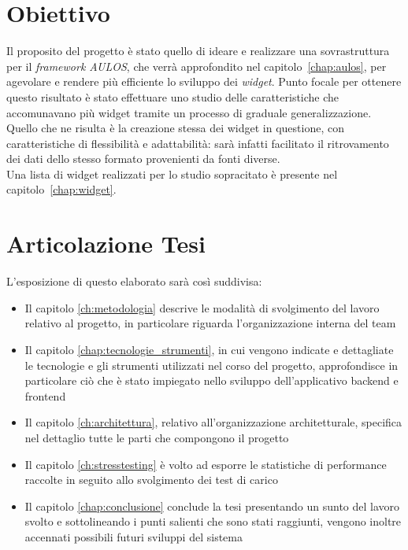 \pagebreak
\section{Obiettivo}
Il proposito del progetto è stato quello di ideare e realizzare una sovrastruttura per il \textit{framework AULOS}, che verrà approfondito nel capitolo~\ref{chap:aulos}, per agevolare e rendere più efficiente lo sviluppo dei \textit{widget}. Punto focale per ottenere questo risultato è stato effettuare uno studio delle caratteristiche che accomunavano più widget tramite un processo di graduale generalizzazione.
Quello che ne risulta è la creazione stessa dei widget in questione, con caratteristiche di flessibilità e adattabilità: sarà infatti facilitato il ritrovamento dei dati dello stesso formato provenienti da fonti diverse. \\
Una lista di widget realizzati per lo studio sopracitato è presente nel capitolo~\ref{chap:widget}.

\section{Articolazione Tesi}
L'esposizione di questo elaborato sarà così suddivisa:
\begin{itemize}
    \item Il capitolo \ref{ch:metodologia} descrive le modalità di svolgimento del lavoro relativo al progetto, in particolare riguarda l'organizzazione interna del team
    \item Il capitolo \ref{chap:tecnologie_strumenti}, in cui vengono indicate e dettagliate le tecnologie e gli strumenti utilizzati nel corso del progetto, approfondisce in particolare ciò che è stato impiegato nello sviluppo dell'applicativo backend e frontend
    \item Il capitolo \ref{ch:architettura}, relativo all'organizzazione architetturale, specifica nel dettaglio tutte le parti che compongono il progetto
    \item Il capitolo \ref{ch:stresstesting} è volto ad esporre le statistiche di performance raccolte in seguito allo svolgimento dei test di carico
    \item Il capitolo \ref{chap:conclusione} conclude la tesi presentando un sunto del lavoro svolto e sottolineando i punti salienti che sono stati raggiunti, vengono inoltre accennati possibili futuri sviluppi del sistema
\end{itemize}